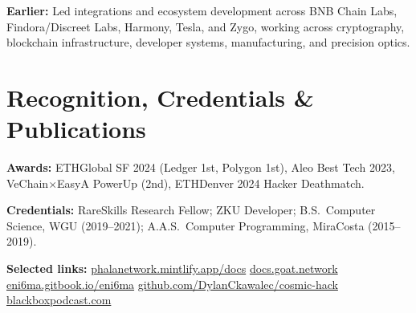 \documentclass[10pt]{article}
\let\resumeoldtextbf\textbf
\renewcommand{\textbf}[1]{\textcolor{HighlightGray}{\resumeoldtextbf{#1}}}
\newcommand{\link}[2]{\href{#1}{\textcolor{TitleBlue}{#2}}}
\begin{document}
\vspace{1pt}
{\footnotesize\textcolor{HighlightGray}{\textbf{Earlier:} Led integrations and ecosystem development across BNB Chain Labs, Findora/Discreet Labs, Harmony, Tesla, and Zygo, working across cryptography, blockchain infrastructure, developer systems, manufacturing, and precision optics.}}

\section*{Recognition, Credentials \& Publications}
\small
\textbf{Awards:} ETHGlobal SF 2024 (Ledger 1st, Polygon 1st), Aleo Best Tech 2023, VeChain\(\times\)EasyA PowerUp (2nd), ETHDenver 2024 Hacker Deathmatch.\par
\textbf{Credentials:} RareSkills Research Fellow; ZKU Developer; B.S.\ Computer Science, WGU (2019--2021); A.A.S.\ Computer Programming, MiraCosta (2015--2019).\par
\textbf{Selected links:} \link{https://phalanetwork.mintlify.app/docs}{phalanetwork.mintlify.app/docs} \textbar{} \link{https://docs.goat.network/}{docs.goat.network} \textbar{} \link{https://eni6ma.gitbook.io/eni6ma/}{eni6ma.gitbook.io/eni6ma} \textbar{} \link{https://github.com/DylanCkawalec/cosmic-hack}{github.com/DylanCkawalec/cosmic-hack} \textbar{} \link{https://blackboxpodcast.com/}{blackboxpodcast.com}
\end{document}
